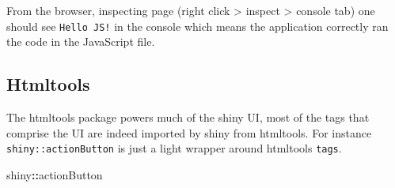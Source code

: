 \documentclass[
]{krantz}
\makeatletter
\newenvironment{Shaded}{\begin{snugshade}}{\end{snugshade}}
\newcommand{\CommentTok}[1]{\textcolor[rgb]{0.37,0.37,0.37}{\textit{#1}}}
\newcommand{\ControlFlowTok}[1]{\textcolor[rgb]{0.27,0.27,0.27}{\textbf{#1}}}
\newcommand{\DataTypeTok}[1]{\textcolor[rgb]{0.27,0.27,0.27}{#1}}
\newcommand{\KeywordTok}[1]{\textcolor[rgb]{0.27,0.27,0.27}{\textbf{#1}}}
\newcommand{\NormalTok}[1]{#1}
\newcommand{\OperatorTok}[1]{\textcolor[rgb]{0.43,0.43,0.43}{\textbf{#1}}}
\newcommand{\StringTok}[1]{\textcolor[rgb]{0.5,0.5,0.5}{#1}}
\newenvironment{kframe}{%
\medskip{}
\setlength{\fboxsep}{.8em}
 \def\at@end@of@kframe{}%
 \ifinner\ifhmode%
  \def\at@end@of@kframe{\end{minipage}}%
  \begin{minipage}{\columnwidth}%
 \fi\fi%
 \def\FrameCommand##1{\hskip\@totalleftmargin \hskip-\fboxsep
 \colorbox{shadecolor}{##1}\hskip-\fboxsep
     \hskip-\linewidth \hskip-\@totalleftmargin \hskip\columnwidth}%
 \MakeFramed {\advance\hsize-\width
   \@totalleftmargin\z@ \linewidth\hsize
   \@setminipage}}%
 {\par\unskip\endMakeFramed%
 \at@end@of@kframe}
\renewenvironment{Shaded}{\begin{kframe}}{\end{kframe}}
\makeatother
\begin{document}
\begin{Shaded}
\end{Shaded}

From the browser, inspecting page (right click \textgreater{} inspect \textgreater{} console tab) one should see \texttt{Hello\ JS!} in the console which means the application correctly ran the code in the JavaScript file.

\hypertarget{basics-htmltools}{%
\subsection{Htmltools}\label{basics-htmltools}}

The htmltools package powers much of the shiny UI, most of the tags that comprise the UI are indeed imported by shiny from htmltools. For instance \texttt{shiny::actionButton} is just a light wrapper around htmltools \texttt{tags}.

\begin{Shaded}
\begin{Highlighting}[]
\NormalTok{shiny}\OperatorTok{::}\NormalTok{actionButton}
\end{Highlighting}
\end{Shaded}
\end{document}
